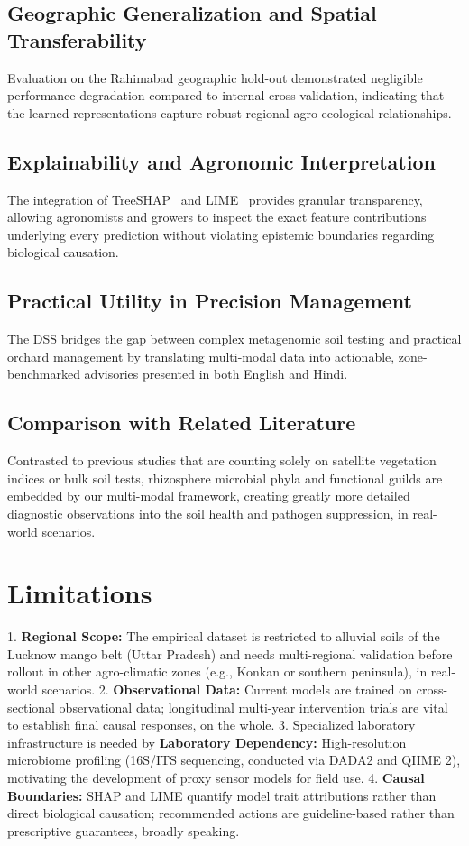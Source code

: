 \documentclass[runningheads,a4paper,oribibl]{llncs}
\begin{document}
\subsection{Geographic Generalization and Spatial Transferability}
Evaluation on the Rahimabad geographic hold-out demonstrated negligible performance degradation compared to internal cross-validation, indicating that the learned representations capture robust regional agro-ecological relationships.

\subsection{Explainability and Agronomic Interpretation}
The integration of TreeSHAP~\cite{lundberg2017} and LIME~\cite{ribeiro2016} provides granular transparency, allowing agronomists and growers to inspect the exact feature contributions underlying every prediction without violating epistemic boundaries regarding biological causation.

\subsection{Practical Utility in Precision Management}
The DSS bridges the gap between complex metagenomic soil testing and practical orchard management by translating multi-modal data into actionable, zone-benchmarked advisories presented in both English and Hindi.

\subsection{Comparison with Related Literature}
Contrasted to previous studies that are counting solely on satellite vegetation indices or bulk soil tests, rhizosphere microbial phyla and functional guilds are embedded by our multi-modal framework, creating greatly more detailed diagnostic observations into the soil health\cite{doran2000} and pathogen suppression, in real-world scenarios.


\section{Limitations}

1. \textbf{Regional Scope:} The empirical dataset is restricted to alluvial soils of the Lucknow mango belt (Uttar Pradesh) and needs multi-regional validation before rollout in other agro-climatic zones (e.g., Konkan or southern peninsula), in real-world scenarios.
2. \textbf{Observational Data:} Current models are trained on cross-sectional observational data; longitudinal multi-year intervention trials are vital to establish final causal responses, on the whole.
3. Specialized laboratory infrastructure is needed by \textbf{Laboratory Dependency:} High-resolution microbiome profiling (16S/ITS sequencing, conducted via DADA2\cite{callahan2016} and QIIME 2\cite{bolyen2019}), motivating the development of proxy sensor models for field use.
4. \textbf{Causal Boundaries:} SHAP and LIME quantify model trait attributions rather than direct biological causation; recommended actions are guideline-based rather than prescriptive guarantees, broadly speaking.
\end{document}

